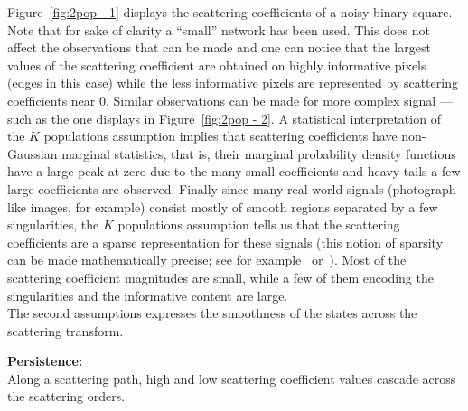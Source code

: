 \documentclass[a4paper,11pt]{report}
\begin{document}
		
		Figure~\ref{fig:2pop - 1} displays the scattering coefficients of a noisy binary square. Note that for sake of clarity a ``small'' network has been used. This does not affect the observations that can be made and one can notice that the largest values of the scattering coefficient are obtained on highly informative pixels (edges in this case) while the less informative pixels are represented by scattering coefficients near $0$. Similar observations can be made for more complex signal ---such as the one displays in Figure~\ref{fig:2pop - 2}. A statistical interpretation of the $K$ populations assumption implies that scattering coefficients have non-Gaussian marginal statistics, that is, their marginal probability density functions have a large peak at zero due to the many small coefficients and heavy tails a few large coefficients are observed. Finally since many real-world signals (photograph-like images, for example) consist mostly of smooth regions separated by a few singularities, the $K$ populations assumption tells us that the scattering coefficients are a sparse representation for these signals (this notion of sparsity can be made mathematically precise; see for example~\citep{donoho1993unconditional} or~\citep{devore1992image}). Most of the scattering coefficient magnitudes are small, while a few of them encoding the singularities and the informative content are large.\\
		
		The second assumptions expresses the smoothness of the states across the scattering transform.\\
		
		\begin{assumption}\textbf{Persistence:}\\
		  Along a scattering path, high and low scattering coefficient values cascade across the scattering orders.\\
		  \label{assum:Persistence}
		\end{assumption}
\end{document}
